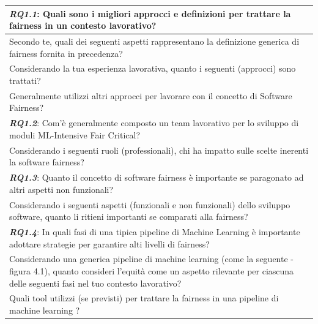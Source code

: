     \begin{longtable}{| p{} |} 
        
        \hline
        \rowcolor{Gray}
        \textbf{\textit{{RQ1.1}}}:  Quali sono i migliori approcci e definizioni per trattare la fairness in un contesto lavorativo?\\
        
        \hline 
         Secondo te, quali dei seguenti aspetti rappresentano la definizione generica di fairness fornita in precedenza?
         \\ \hline
        Considerando la tua esperienza lavorativa, quanto i seguenti (approcci) sono trattati?
        \\ \hline
        Generalmente utilizzi altri approcci per lavorare con il concetto di Software Fairness?
        \\ \hline
        
        \rowcolor{Gray}
        \textbf{\textit{{RQ1.2}}}:  Com'è generalmente composto un team lavorativo per lo sviluppo di moduli ML-Intensive Fair Critical?\\
        
        \hline 
         Considerando i seguenti ruoli (professionali), chi ha impatto sulle scelte inerenti la software fairness?
       
        \\ \hline
        \rowcolor{Gray}
        \textbf{\textit{{RQ1.3}}}:  Quanto il concetto di software fairness è importante se paragonato ad altri aspetti non funzionali?\\
        
        \hline 
         Considerando i seguenti aspetti (funzionali e non funzionali) dello sviluppo software, quanto li ritieni importanti se comparati alla fairness?
         
        \\ \hline
        \rowcolor{Gray}
        \textbf{\textit{{RQ1.4}}}:  In quali fasi di una tipica pipeline di Machine Learning è importante adottare strategie per garantire alti livelli di fairness?\\
        
        \hline 
         Considerando una generica pipeline di machine learning (come la seguente - figura 4.1), quanto consideri l’equità come un aspetto rilevante per ciascuna delle seguenti fasi nel tuo contesto lavorativo?
         
         \\ \hline
        Quali tool utilizzi (se previsti) per trattare la fairness in una pipeline di machine learning ?
        

\end{longtable}
